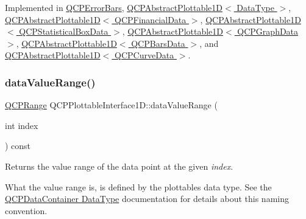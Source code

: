 Implemented in \hyperlink{class_q_c_p_error_bars_a1ef91328ad7dde84695958139d5f40cf}{Q\+C\+P\+Error\+Bars}, \hyperlink{class_q_c_p_abstract_plottable1_d_a6fce4e684f33a31c45928899b5d9ab4b}{Q\+C\+P\+Abstract\+Plottable1\+D$<$ Data\+Type $>$}, \hyperlink{class_q_c_p_abstract_plottable1_d_a6fce4e684f33a31c45928899b5d9ab4b}{Q\+C\+P\+Abstract\+Plottable1\+D$<$ Q\+C\+P\+Financial\+Data $>$}, \hyperlink{class_q_c_p_abstract_plottable1_d_a6fce4e684f33a31c45928899b5d9ab4b}{Q\+C\+P\+Abstract\+Plottable1\+D$<$ Q\+C\+P\+Statistical\+Box\+Data $>$}, \hyperlink{class_q_c_p_abstract_plottable1_d_a6fce4e684f33a31c45928899b5d9ab4b}{Q\+C\+P\+Abstract\+Plottable1\+D$<$ Q\+C\+P\+Graph\+Data $>$}, \hyperlink{class_q_c_p_abstract_plottable1_d_a6fce4e684f33a31c45928899b5d9ab4b}{Q\+C\+P\+Abstract\+Plottable1\+D$<$ Q\+C\+P\+Bars\+Data $>$}, and \hyperlink{class_q_c_p_abstract_plottable1_d_a6fce4e684f33a31c45928899b5d9ab4b}{Q\+C\+P\+Abstract\+Plottable1\+D$<$ Q\+C\+P\+Curve\+Data $>$}.

\mbox{\label{class_q_c_p_plottable_interface1_d_a9ca7fcf14d885a200879768679b19be9}} 
\subsubsection{\texorpdfstring{data\+Value\+Range()}{dataValueRange()}}
{\footnotesize\ttfamily \hyperlink{class_q_c_p_range}{Q\+C\+P\+Range} Q\+C\+P\+Plottable\+Interface1\+D\+::data\+Value\+Range (\begin{DoxyParamCaption}\item[{int}]{index }\end{DoxyParamCaption}) const\hspace{0.3cm}{\ttfamily [pure virtual]}}

Returns the value range of the data point at the given {\itshape index}.

What the value range is, is defined by the plottable\textquotesingle{}s data type. See the \hyperlink{class_q_c_p_data_container_qcpdatacontainer-datatype}{Q\+C\+P\+Data\+Container Data\+Type} documentation for details about this naming convention. 

